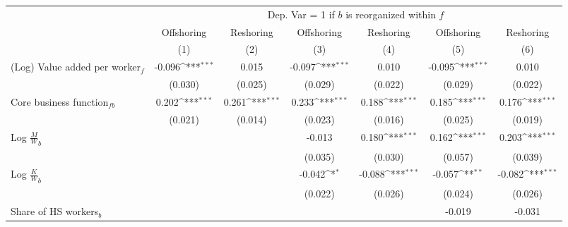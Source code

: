 \begin{table}[htbp] \footnotesize \centering
\def\sym#1{\ifmmode^{#1}\else\(^{#1}\)\fi}
\renewcommand{\arraystretch}{1}
\begin{tabular}{l*{6}{c}}
\toprule
&\multicolumn{6}{c}{Dep. Var = 1 if $ b $ is reorganized within $ f $} \\
\cmidrule(lr){2-7}
                &\multicolumn{1}{c}{Offshoring}&\multicolumn{1}{c}{Reshoring}&\multicolumn{1}{c}{Offshoring}&\multicolumn{1}{c}{Reshoring}&\multicolumn{1}{c}{Offshoring}&\multicolumn{1}{c}{Reshoring}\\\cmidrule(lr){2-2}\cmidrule(lr){3-3}\cmidrule(lr){4-4}\cmidrule(lr){5-5}\cmidrule(lr){6-6}\cmidrule(lr){7-7}
                &\multicolumn{1}{c}{(1)}         &\multicolumn{1}{c}{(2)}         &\multicolumn{1}{c}{(3)}         &\multicolumn{1}{c}{(4)}         &\multicolumn{1}{c}{(5)}         &\multicolumn{1}{c}{(6)}         \\
\midrule
(Log) Value added per worker$ _f$&   -0.096\sym{***}&    0.015         &   -0.097\sym{***}&    0.010         &   -0.095\sym{***}&    0.010         \\
                &  (0.030)         &  (0.025)         &  (0.029)         &  (0.022)         &  (0.029)         &  (0.022)         \\
\addlinespace
Core business function$ _{fb}$&    0.202\sym{***}&    0.261\sym{***}&    0.233\sym{***}&    0.188\sym{***}&    0.185\sym{***}&    0.176\sym{***}\\
                &  (0.021)         &  (0.014)         &  (0.023)         &  (0.016)         &  (0.025)         &  (0.019)         \\
\addlinespace
Log $\frac{M}{W}_b$&                  &                  &   -0.013         &    0.180\sym{***}&    0.162\sym{***}&    0.203\sym{***}\\
                &                  &                  &  (0.035)         &  (0.030)         &  (0.057)         &  (0.039)         \\
\addlinespace
Log $\frac{K}{W}_b$&                  &                  &   -0.042\sym{*}  &   -0.088\sym{***}&   -0.057\sym{**} &   -0.082\sym{***}\\
                &                  &                  &  (0.022)         &  (0.026)         &  (0.024)         &  (0.026)         \\
\addlinespace
Share of HS workers$ _b$&                  &                  &                  &                  &   -0.019         &   -0.031         \\

\end{tabular}
\end{table}
